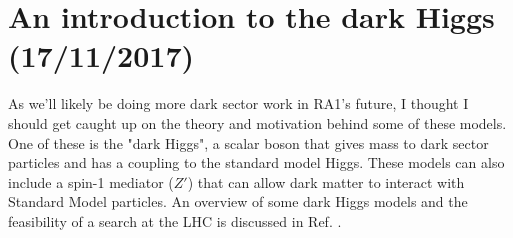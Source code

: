 \newpage
\chapter{An introduction to the dark Higgs (17/11/2017)}

As we'll likely be doing more dark sector work in RA1's future, I thought I should get caught up on the theory and motivation behind some of these models. One of these is the "dark Higgs", a scalar boson that gives mass to dark sector particles and has a coupling to the standard model Higgs. These models can also include a spin-1 mediator ($Z'$) that can allow dark matter to interact with Standard Model particles. An overview of some dark Higgs models and the feasibility of a search at the LHC is discussed in Ref. \cite{Duerr:2017uap}.